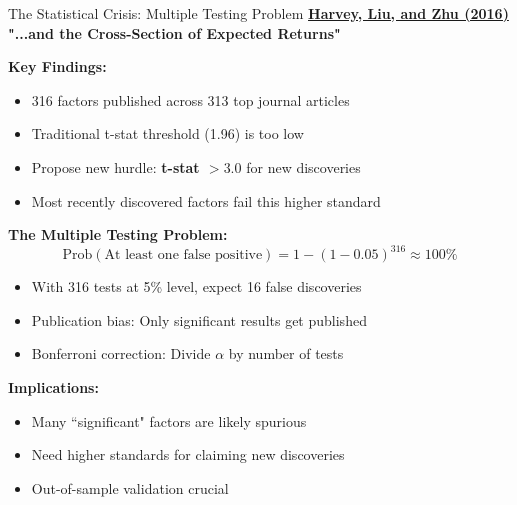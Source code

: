 \documentclass{beamer}
\begin{document}
\begin{frame}{The Statistical Crisis: Multiple Testing Problem}
    \textbf{\textcolor{blue}{\href{https://doi.org/10.1093/rfs/hhv059}{Harvey, Liu, and Zhu (2016)}} "...and the Cross-Section of Expected Returns"}
    
    
    \textbf{Key Findings:}
    \begin{itemize}
        \item 316 factors published across 313 top journal articles
        \item Traditional t-stat threshold (1.96) is too low
        \item Propose new hurdle: \textbf{t-stat $> 3.0$} for new discoveries
        \item Most recently discovered factors fail this higher standard
    \end{itemize}
    
    
    \textbf{The Multiple Testing Problem:}
    \begin{equation*}
        \text{Prob}(\text{At least one false positive}) = 1 - (1-0.05)^{316} \approx 100\%
    \end{equation*}
    
    \begin{itemize}
        \item With 316 tests at 5\% level, expect 16 false discoveries
        \item Publication bias: Only significant results get published
        \item Bonferroni correction: Divide $\alpha$ by number of tests
    \end{itemize}
    
    
    \textbf{Implications:}
    \begin{itemize}
        \item Many ``significant" factors are likely spurious
        \item Need higher standards for claiming new discoveries
        \item Out-of-sample validation crucial
    \end{itemize}
\end{frame}
\end{document}
